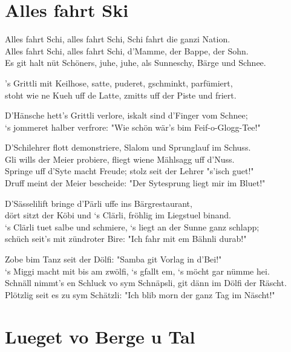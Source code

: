 \documentclass[
  letterpaper,
]{scrbook}
\begin{document}
\hypertarget{alles-fahrt-ski}{%
\chapter{Alles fahrt Ski}\label{alles-fahrt-ski}}

Alles fahrt Schi, alles fahrt Schi, Schi fahrt die ganzi Nation.\\
Alles fahrt Schi, alles fahrt Schi, d'Mamme, der Bappe, der Sohn.\\
Es git halt nüt Schöners, juhe, juhe, als Sunneschy, Bärge und Schnee.

's Grittli mit Keilhose, satte, puderet, gschminkt, parfümiert,\\
stoht wie ne Kueh uff de Latte, zmitts uff der Piste und friert.

D'Hänsche hett's Grittli verlore, iskalt sind d'Finger vom Schnee;\\
`s jommeret halber verfrore: "Wie schön wär's bim Feif-o-Glogg-Tee!"

D'Schilehrer flott demonstriere, Slalom und Sprunglauf im Schuss.\\
Gli wills der Meier probiere, fliegt wiene Mählsagg uff d'Nuss.\\
Springe uff d'Syte macht Freude; stolz seit der Lehrer "s'isch guet!"\\
Druff meint der Meier bescheide: "Der Sytesprung liegt mir im Bluet!"

D'Sässelilift bringe d'Pärli uffe ins Bärgrestaurant,\\
dört sitzt der Köbi und `s Clärli, fröhlig im Liegstuel binand.\\
`s Clärli tuet salbe und schmiere, `s liegt an der Sunne ganz schlapp;\\
schüch seit's mit zündroter Bire: "Ich fahr mit em Bähnli durab!"

Zobe bim Tanz seit der Dölfi: "Samba git Vorlag in d'Bei!"\\
`s Miggi macht mit bis am zwölfi, `s gfallt em, `s möcht gar nümme
hei.\\
Schnäll nimmt's en Schluck vo sym Schnäpsli, git dänn im Dölfi der
Räscht.\\
Plötzlig seit es zu sym Schätzli: "Ich blib morn der ganz Tag im
Näscht!"

\hypertarget{lueget-vo-berge-u-tal}{%
\chapter{Lueget vo Berge u Tal}\label{lueget-vo-berge-u-tal}}
\end{document}
